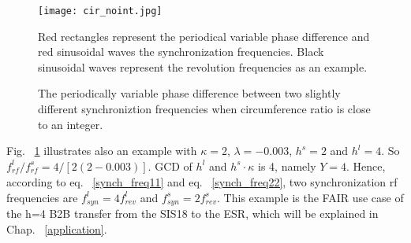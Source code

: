 
\begin{figure}[!htb]
   \centering   
   \texttt{[image: cir\_noint.jpg]}
   \caption{The periodically variable phase difference between two slightly different synchroniztion frequencies when circumference ratio is close to an integer.}{Red rectangles represent the periodical variable phase difference and red sinusoidal waves the synchronization frequencies. Black sinusoidal waves represent the revolution frequencies as an example.}
   \label{cir_noint}
\end{figure} 


Fig. ~\ref{cir_noint} illustrates also an example with $\kappa=2$, $\lambda=-0.003$, $h^s=2$ and $h^l=4$. So $f_{\mathit{rf}}^{l}/f_{\mathit{rf}}^{s}=4/[2(2-0.003)]$. GCD of $h^l$ and $h^s \cdot \kappa$ is 4, namely $Y=4$. Hence, according to eq. ~\ref{synch_freq11} and eq. ~\ref{synch_freq22}, two synchronization rf frequencies are $f_{\mathit{syn}}^{l}=4f_{\mathit{rev}}^{l}$ and $f_{\mathit{syn}}^{s}=2f_{\mathit{rev}}^{s}$. This example is the FAIR use case of the h=4 B2B transfer from the SIS18 to the ESR, which will be explained in Chap. ~\ref{application}. 

